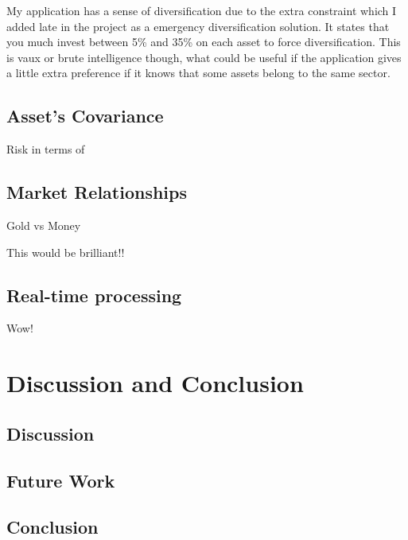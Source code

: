 \documentclass{pdfmx4020}
\begin{document}
    My application has a sense of diversification due to the extra constraint which I added late in the project as a emergency diversification solution. It states that you much invest between 5\% and 35\% on each asset to force diversification. This is vaux or brute intelligence though, what could be useful if the application gives a little extra preference if it knows that some assets belong to the same sector. 

  \section{Asset's Covariance} %
  \label{sec:covariance}
    Risk in terms of 

  \section{Market Relationships} %
  \label{sec:market_relationships}
    Gold vs Money



    This would be brilliant!!

  \section{Real-time processing} %
  \label{sec:real_time_processing}
    Wow!


\chapter{Discussion and Conclusion}

  \section{Discussion} %
  \label{sec:discussion}
  

  \section{Future Work} %
  \label{sec:future_work}
  

  \section{Conclusion} %
  \label{sec:conclusion}
  






\end{document}

